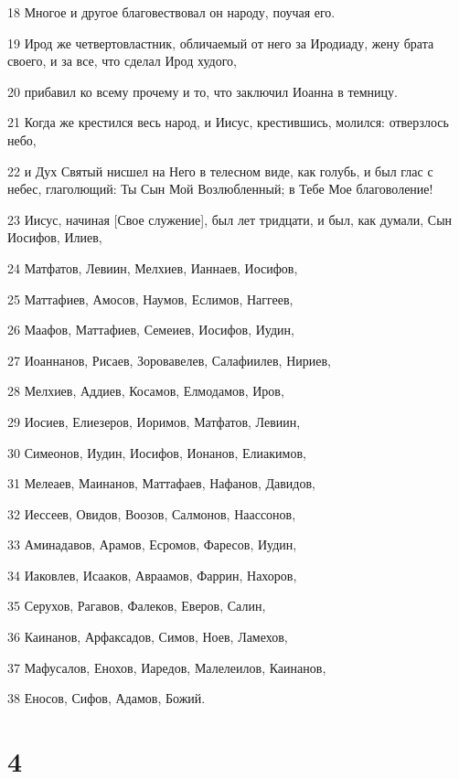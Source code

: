 \par 18 Многое и другое благовествовал он народу, поучая его.
\par 19 Ирод же четвертовластник, обличаемый от него за Иродиаду, жену брата своего, и за все, что сделал Ирод худого,
\par 20 прибавил ко всему прочему и то, что заключил Иоанна в темницу.
\par 21 Когда же крестился весь народ, и Иисус, крестившись, молился: отверзлось небо,
\par 22 и Дух Святый нисшел на Него в телесном виде, как голубь, и был глас с небес, глаголющий: Ты Сын Мой Возлюбленный; в Тебе Мое благоволение!
\par 23 Иисус, начиная [Свое служение], был лет тридцати, и был, как думали, Сын Иосифов, Илиев,
\par 24 Матфатов, Левиин, Мелхиев, Ианнаев, Иосифов,
\par 25 Маттафиев, Амосов, Наумов, Еслимов, Наггеев,
\par 26 Маафов, Маттафиев, Семеиев, Иосифов, Иудин,
\par 27 Иоаннанов, Рисаев, Зоровавелев, Салафиилев, Нириев,
\par 28 Мелхиев, Аддиев, Косамов, Елмодамов, Иров,
\par 29 Иосиев, Елиезеров, Иоримов, Матфатов, Левиин,
\par 30 Симеонов, Иудин, Иосифов, Ионанов, Елиакимов,
\par 31 Мелеаев, Маинанов, Маттафаев, Нафанов, Давидов,
\par 32 Иессеев, Овидов, Воозов, Салмонов, Наассонов,
\par 33 Аминадавов, Арамов, Есромов, Фаресов, Иудин,
\par 34 Иаковлев, Исааков, Авраамов, Фаррин, Нахоров,
\par 35 Серухов, Рагавов, Фалеков, Еверов, Салин,
\par 36 Каинанов, Арфаксадов, Симов, Ноев, Ламехов,
\par 37 Мафусалов, Енохов, Иаредов, Малелеилов, Каинанов,
\par 38 Еносов, Сифов, Адамов, Божий.

\chapter{4}


